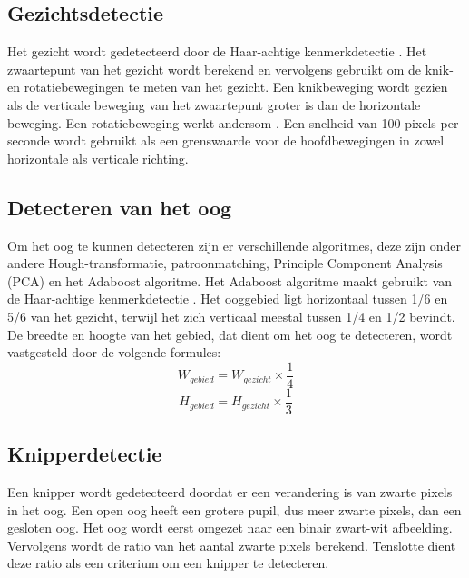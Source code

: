 \subsection{Gezichtsdetectie}
Het gezicht wordt gedetecteerd door de Haar-achtige kenmerkdetectie \autocite{Viola2004}. Het zwaartepunt van het gezicht wordt berekend en vervolgens gebruikt om de knik- en rotatiebewegingen te meten van het gezicht. Een knikbeweging wordt gezien als de verticale beweging van het zwaartepunt groter is dan de horizontale beweging. Een rotatiebeweging werkt andersom \autocite{Jibo2013}. Een snelheid van 100 pixels per seconde wordt gebruikt als een grenswaarde voor de hoofdbewegingen in zowel horizontale als verticale richting.
\subsection{Detecteren van het oog}
Om het oog te kunnen detecteren zijn er verschillende algoritmes, deze zijn onder andere Hough-transformatie, patroonmatching, Principle Component Analysis (PCA) en het Adaboost algoritme. Het Adaboost algoritme maakt gebruikt van de Haar-achtige kenmerkdetectie \autocite{Viola2004}. Het ooggebied ligt horizontaal tussen 1/6 en 5/6 van het gezicht, terwijl het zich verticaal meestal tussen 1/4 en 1/2 bevindt. De breedte en hoogte van het gebied, dat dient om het oog te detecteren, wordt vastgesteld door de volgende formules: \begin{equation*}W_{gebied} = W_{gezicht} \times \frac{1}{4} \end{equation*} \begin{equation*}H_{gebied} = H_{gezicht} \times \frac{1}{3} \end{equation*}
\subsection{Knipperdetectie}
Een knipper wordt gedetecteerd doordat er een verandering is van zwarte pixels in het oog. Een open oog heeft een grotere pupil, dus meer zwarte pixels, dan een gesloten oog. Het oog wordt eerst omgezet naar een binair zwart-wit afbeelding. Vervolgens wordt de ratio van het aantal zwarte pixels berekend. Tenslotte dient deze ratio als een criterium om een knipper te detecteren.

